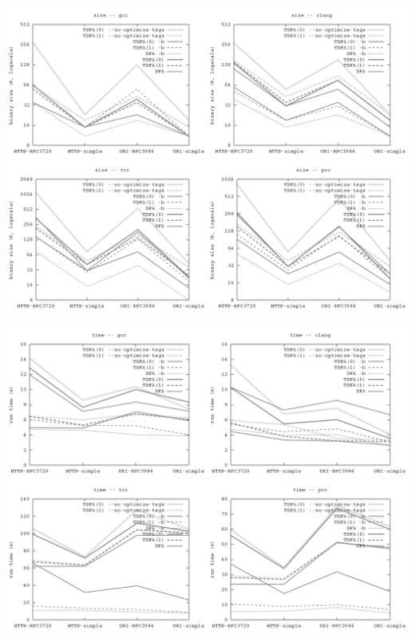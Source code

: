 \documentclass{article}
\theoremstyle{definition}
\begin{document}
\begin{multicols}{2}
\begin{table}
\begin{center}
\includegraphics[width=\linewidth]{img/bench/size_gcc_clang.png}\\
\includegraphics[width=\linewidth]{img/bench/size_tcc_pcc.png}\\
\end{center}
\end{table}

\begin{table}
\begin{center}
\includegraphics[width=\linewidth]{img/bench/time_gcc_clang.png}\\
\includegraphics[width=\linewidth]{img/bench/time_tcc_pcc.png}\\
\end{center}
\end{table}


\end{multicols}
\end{document}

